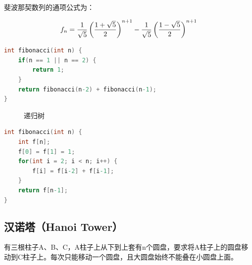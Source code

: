 斐波那契数列的通项公式为：

$$
	f_n = {1 \over \sqrt{5}} \left({1 + \sqrt{5} \over 2} \right)^{n+1} - {1 \over \sqrt{5}} \left({1 - \sqrt{5} \over 2} \right)^{n+1}
$$

\vspace{0.5cm}


\begin{lstlisting}[language=C]
int fibonacci(int n) {
    if(n == 1 || n == 2) {
        return 1;
    }
    return fibonacci(n-2) + fibonacci(n-1);
}
\end{lstlisting}

\begin{figure}[H]
	\centering
	\caption{递归树}
\end{figure}

\vspace{0.5cm}


\begin{lstlisting}[language=C]
int fibonacci(int n) {
    int f[n];
    f[0] = f[1] = 1;
    for(int i = 2; i < n; i++) {
        f[i] = f[i-2] + f[i-1];
    }
    return f[n-1];
}
\end{lstlisting}

\vspace{0.5cm}

\subsection{汉诺塔（Hanoi Tower）}

有三根柱子A、B、C，A柱子上从下到上套有n个圆盘，要求将A柱子上的圆盘移动到C柱子上。每次只能移动一个圆盘，且大圆盘始终不能叠在小圆盘上面。\\

